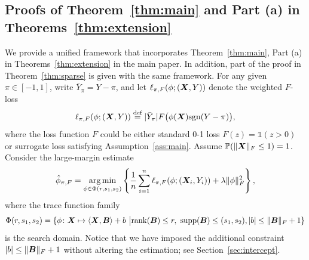 \documentclass[11pt]{article}
\theoremstyle{plain}
\theoremstyle{definition}
\def\sign{\textup{sgn}}
\def\shift{\bar Y_\pi}
\begin{document}
\subsection{Proofs of Theorem~\ref{thm:main} and Part (a) in Theorems~\ref{thm:extension}}\label{sec:sign}
We provide a unified framework that incorporates Theorem~\ref{thm:main}, Part (a) in Theorems~\ref{thm:extension} in the main paper. In addition, part of the proof in Theorem~\ref{thm:sparse} is given with the same framework.  For any given $\pi\in[-1,1]$, write $\shift=Y-\pi$, and let $\ell_{\pi,F}(\phi; (\bm X, Y))$ denote the weighted $F$-loss
\[
\ell_{\pi,F}(\phi; (\mX, Y))\stackrel{\text{def}}{=}|\shift| F\big(\phi(\mX)\sign(Y-\pi)\big),
\]
where the loss function $F$ could be either standard 0-1 loss $F(z)=\mathds{1}(z>0)$ or surrogate loss satisfying Assumption~\ref{ass:main}. Assume $\mathbb{P}(\lVert\bm X\rVert_F\leq 1)=1$. Consider the large-margin estimate
\begin{align}
\hat \phi_{\pi,F}=\operatorname*{arg\,min}_{\phi \in\Phi(r,s_1,s_2)}\left\{ {1\over n}\sum_{i=1}^n \ell_{\pi,F}(\phi; (\bm X_i,Y_i))+ \lambda \lVert\phi\rVert_F^2\right\},
\end{align}
where the trace function family
\[
\Phi(r,s_1,s_2)=\{\phi\colon \bm X\mapsto \langle \bm X, \bm B \rangle +b \ \big| \text{rank}(\bm B)\leq r,\  \text{supp}(\bm B)\leq (s_1,s_2), |b|\leq \lVert\bm B\rVert_F+1\}
\]
is the search domain. Notice that we have imposed the additional constraint $|b|\leq \lVert\bm B\rVert_F+1$ without altering the estimation; see Section~\ref{sec:intercept}.
\end{document}
